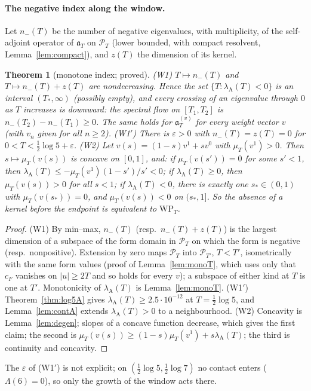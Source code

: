 \documentclass[11pt]{amsart}
\newtheorem{theorem}{Theorem}[section]
\theoremstyle{definition}
\theoremstyle{remark}
\newcommand{\PT}{\mathcal P_T}
\newcommand{\lamA}{\lambda_{\mathrm A}(T)}
\begin{document}
\paragraph{The negative index along the window.}
Let $n_-(T)$ be the number of negative eigenvalues, with multiplicity, of the self-adjoint operator of $\mathfrak a_T$ on $\PT$
(lower bounded, with compact resolvent, Lemma~\ref{lem:compact}), and $z(T)$ the dimension of its kernel.

\begin{theorem}[monotone index; proved]\label{thm:geo-index}
\emph{(W1)} $T\mapsto n_-(T)$ and $T\mapsto n_-(T)+z(T)$ are nondecreasing. Hence the set $\{T:\lamA<0\}$ is an interval $(T_*,\infty)$
(possibly empty), and every crossing of an eigenvalue through $0$ as $T$ increases is downward: the spectral flow on $[T_1,T_2]$ is
$n_-(T_2)-n_-(T_1)\ge0$. The same holds for $\mathfrak a^{(v)}_T$ for every weight vector $v$ (with $v_n$ given for all $n\ge2$).
\emph{(W1$'$)} There is $\varepsilon>0$ with $n_-(T)=z(T)=0$ for $0<T<\frac12\log5+\varepsilon$.
\emph{(W2)} Let $v(s)=(1-s)v^1+sv^0$ with $\mu_T(v^1)>0$. Then $s\mapsto\mu_T(v(s))$ is concave on $[0,1]$, and: if $\mu_T(v(s'))=0$ for some
$s'<1$, then $\lamA\le-\mu_T(v^1)(1-s')/s'<0$; if $\lamA\ge0$, then $\mu_T(v(s))>0$ for all $s<1$; if $\lamA<0$, there is exactly one
$s_*\in(0,1)$ with $\mu_T(v(s_*))=0$, and $\mu_T(v(s))<0$ on $(s_*,1]$. So the absence of a kernel before the endpoint is equivalent to
$\mathrm{WP}_T$.
\end{theorem}
\begin{proof}
(W1) By min--max, $n_-(T)$ (resp.\ $n_-(T)+z(T)$) is the largest dimension of a subspace of the form domain in $\PT$ on which the
form is negative (resp.\ nonpositive). Extension by zero maps $\PT$ into $\mathcal P_{T'}$, $T<T'$, isometrically with the same form
values (proof of Lemma~\ref{lem:monoT}, which uses only that $c_F$ vanishes on $|u|\ge2T$ and so holds for every $v$); a subspace of
either kind at $T$ is one at $T'$. Monotonicity of $\lamA$ is Lemma~\ref{lem:monoT}. (W1$'$) Theorem~\ref{thm:log5A} gives
$\lamA\ge2.5\cdot10^{-12}$ at $T=\frac12\log5$, and Lemma~\ref{lem:contA} extends $\lamA>0$ to a neighbourhood. (W2) Concavity is
Lemma~\ref{lem:degen}; slopes of a concave function decrease, which gives the first claim; the second is
$\mu_T(v(s))\ge(1-s)\mu_T(v^1)+s\lamA$; the third is continuity and concavity.
\end{proof}

The $\varepsilon$ of (W1$'$) is not explicit; on $(\frac12\log5,\frac12\log7)$ no contact enters ($\Lambda(6)=0$), so only the growth of the
window acts there.
\end{document}
